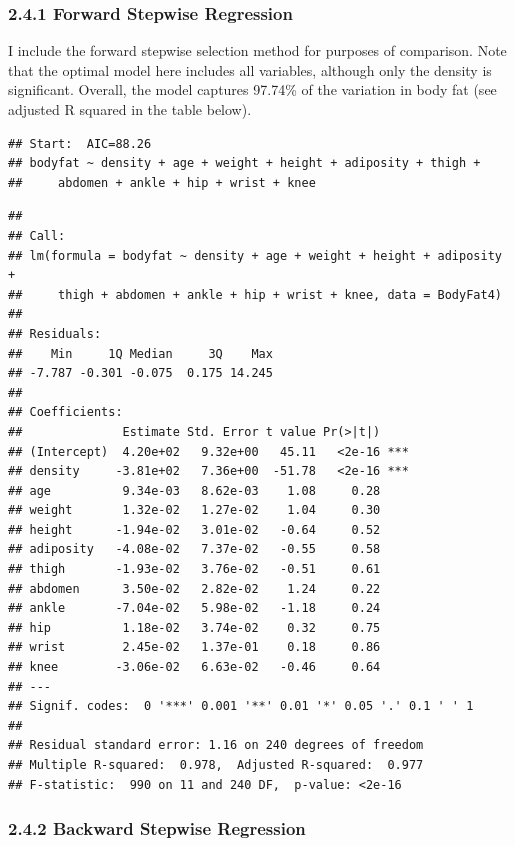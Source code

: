 \documentclass[
]{article}
\begin{document}
\hypertarget{forward-stepwise-regression}{%
\subsubsection{\texorpdfstring{\textbf{2.4.1 Forward Stepwise
Regression}}{2.4.1 Forward Stepwise Regression}}\label{forward-stepwise-regression}}

I include the forward stepwise selection method for purposes of
comparison. Note that the optimal model here includes all variables,
although only the density is significant. Overall, the model captures
97.74\% of the variation in body fat (see adjusted R squared in the
table below).

\begin{verbatim}
## Start:  AIC=88.26
## bodyfat ~ density + age + weight + height + adiposity + thigh + 
##     abdomen + ankle + hip + wrist + knee
\end{verbatim}

\begin{verbatim}
## 
## Call:
## lm(formula = bodyfat ~ density + age + weight + height + adiposity + 
##     thigh + abdomen + ankle + hip + wrist + knee, data = BodyFat4)
## 
## Residuals:
##    Min     1Q Median     3Q    Max 
## -7.787 -0.301 -0.075  0.175 14.245 
## 
## Coefficients:
##              Estimate Std. Error t value Pr(>|t|)    
## (Intercept)  4.20e+02   9.32e+00   45.11   <2e-16 ***
## density     -3.81e+02   7.36e+00  -51.78   <2e-16 ***
## age          9.34e-03   8.62e-03    1.08     0.28    
## weight       1.32e-02   1.27e-02    1.04     0.30    
## height      -1.94e-02   3.01e-02   -0.64     0.52    
## adiposity   -4.08e-02   7.37e-02   -0.55     0.58    
## thigh       -1.93e-02   3.76e-02   -0.51     0.61    
## abdomen      3.50e-02   2.82e-02    1.24     0.22    
## ankle       -7.04e-02   5.98e-02   -1.18     0.24    
## hip          1.18e-02   3.74e-02    0.32     0.75    
## wrist        2.45e-02   1.37e-01    0.18     0.86    
## knee        -3.06e-02   6.63e-02   -0.46     0.64    
## ---
## Signif. codes:  0 '***' 0.001 '**' 0.01 '*' 0.05 '.' 0.1 ' ' 1
## 
## Residual standard error: 1.16 on 240 degrees of freedom
## Multiple R-squared:  0.978,  Adjusted R-squared:  0.977 
## F-statistic:  990 on 11 and 240 DF,  p-value: <2e-16
\end{verbatim}

\hypertarget{backward-stepwise-regression}{%
\subsubsection{\texorpdfstring{\textbf{2.4.2 Backward Stepwise
Regression}}{2.4.2 Backward Stepwise Regression}}\label{backward-stepwise-regression}}
\end{document}
